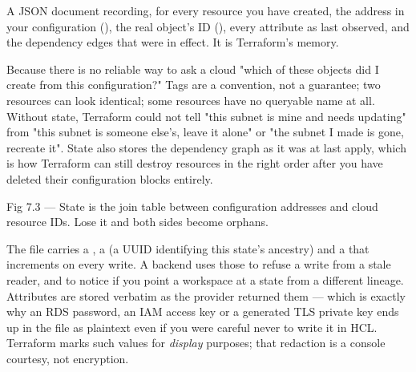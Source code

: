 
 A JSON document recording, for every resource you have created, the address in your configuration (), the real object's ID (), every attribute as last observed, and the dependency edges that were in effect. It is Terraform's memory.

 Because there is no reliable way to ask a cloud "which of these objects did I create from this configuration?" Tags are a convention, not a guarantee; two resources can look identical; some resources have no queryable name at all. Without state, Terraform could not tell "this subnet is mine and needs updating" from "this subnet is someone else's, leave it alone" or "the subnet I made is gone, recreate it". State also stores the dependency graph as it was at last apply, which is how Terraform can still destroy resources in the right order after you have deleted their configuration blocks entirely.

\begin{wbfigure}{Fig 7.3 — State is the join table between configuration addresses and cloud resource IDs. Lose it and both sides become orphans.}
\end{wbfigure}

 The file carries a , a  (a UUID identifying this state's ancestry) and a  that increments on every write. A backend uses those to refuse a write from a stale reader, and to notice if you point a workspace at a state from a different lineage. Attributes are stored verbatim as the provider returned them --- which is exactly why an RDS password, an IAM access key or a generated TLS private key ends up in the file as plaintext even if you were careful never to write it in HCL. Terraform marks such values  for \emph{display} purposes; that redaction is a console courtesy, not encryption.

